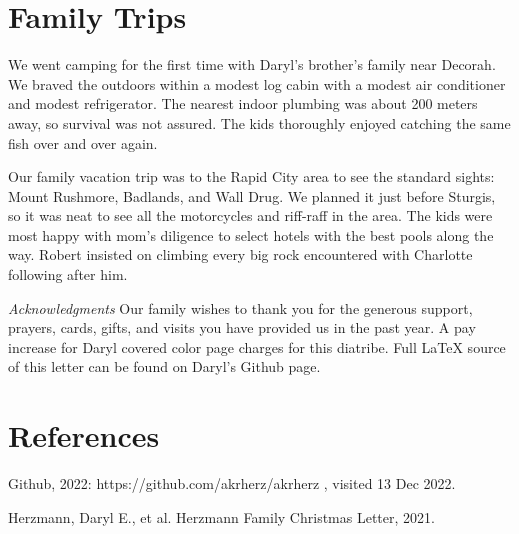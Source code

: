 \documentclass[letterpaper,11pt]{article}
\def\refer{\par\noindent\hangindent\parindent\hangafter1}
\begin{document}
\begin{multicols}{2}
\section{Family Trips}

We went camping for the first time with Daryl's brother's family near Decorah.
We braved the outdoors within a modest log cabin with a modest air conditioner
and modest refrigerator.  The nearest indoor plumbing was about 200 meters away,
so survival was not assured.  The kids thoroughly enjoyed catching the same fish over
and over again.

Our family vacation trip was to the Rapid City area to see the standard sights:
Mount Rushmore, Badlands, and Wall Drug.  We planned it just before Sturgis, so
it was neat to see all the motorcycles and riff-raff in the area.  The kids were
most happy with mom's diligence to select hotels with the best pools along the
way.  Robert insisted on climbing every big rock encountered with Charlotte
following after him.

\bigskip

\emph{Acknowledgments} Our family wishes to thank you for the generous 
support, prayers, cards, gifts, and visits you have provided us in the past
year. A pay increase for Daryl covered color page charges for this diatribe.  Full
\LaTeX\xspace source of this letter can be found on Daryl's Github page. 

\section{References}

\refer Github, 2022: https://github.com/akrherz/akrherz , visited 13 Dec 2022.
\refer Herzmann, Daryl E., et al. Herzmann Family Christmas Letter, 2021.

\end{multicols}
\end{document}
